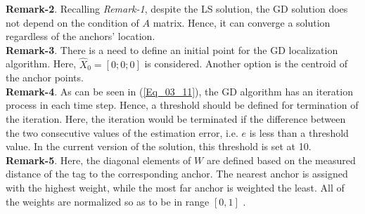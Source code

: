 \documentclass{article}
\begin{document}
\textbf{Remark-2}. Recalling \textit{Remark-1}, despite the LS solution, the GD solution does not depend on the condition of $A$ matrix. Hence, it can converge a solution regardless of the anchors' location. \\

\textbf{Remark-3}.
There is a need to define an initial point for the GD localization algorithm. Here, $\hat{X}_0 = [0;0;0]$ is considered. Another option is the centroid of the anchor points. \\

\textbf{Remark-4}.
As can be seen in (\ref{Eq_03_11}), the GD algorithm has an iteration process in each time step. Hence, a threshold should be defined for termination of the iteration. 
Here, the iteration would be terminated if the difference between the two consecutive values of the estimation error, i.e. $e$ is less than a threshold value. In the current version of the solution, this threshold is set at 10. \\

\textbf{Remark-5}. 
Here, the diagonal elements of $W$ are defined based on the measured distance of the tag to the corresponding anchor. The nearest anchor is assigned with the highest weight, while the most far anchor is weighted the least. All of the weights are normalized so as to be in range $[0,1]$ .
\end{document}
